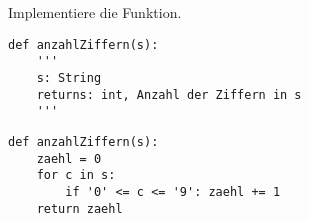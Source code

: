 \question[3] Implementiere die Funktion.

\begin{lstlisting}
def anzahlZiffern(s):
    '''
    s: String
    returns: int, Anzahl der Ziffern in s
    '''
\end{lstlisting}
\begin{solutionbox}{8cm}
\begin{lstlisting}
def anzahlZiffern(s):
    zaehl = 0
    for c in s:
        if '0' <= c <= '9': zaehl += 1
    return zaehl
\end{lstlisting}
\end{solutionbox}
